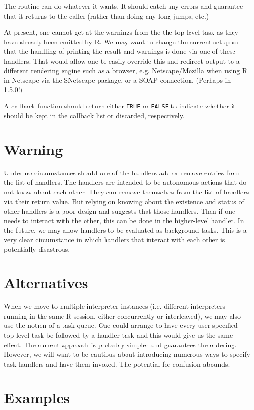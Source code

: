 \documentclass{article}
\begin{document}
The routine can do whatever it wants. It should catch any errors and
guarantee that it returns to the caller (rather than doing any long
jumps, etc.)


At present, one cannot get at the warnings from the the top-level task
as they have already been emitted by R.  We may want to change the
current setup so that the handling of printing the result and warnings
is done via one of these handlers. That would allow one to easily
override this and redirect output to a different rendering engine such
as a browser, e.g.  Netscape/Mozilla when using R in Netscape via the
SNetscape package, or a SOAP connection.  (Perhaps in 1.5.0!)


A callback function should return either \verb+TRUE+ or \verb+FALSE+
to indicate whether it should be kept in the callback list or 
discarded, respectively.

\section{Warning}
Under no circumstances should one of the handlers add or remove
entries from the list of handlers.  The handlers are intended to be
autonomous actions that do not know about each other.  They can remove
themselves from the list of handlers via their return value.  But
relying on knowing about the existence and status of other handlers is
a poor design and suggests that those handlers.  Then if one needs to
interact with the other, this can be done in the higher-level handler.
In the future, we may allow handlers to be evaluated as background
tasks. This is a very clear circumstance in which handlers that
interact with each other is potentially disastrous.


\section{Alternatives}
When we move to multiple interpreter instances (i.e. different
interpreters running in the same R session, either concurrently or
interleaved), we may also use the notion of a task queue.  One could
arrange to have every user-specified top-level task be followed by a
handler task and this would give us the same effect. The current
approach is probably simpler and guarantees the ordering.  However, we
will want to be cautious about introducing numerous ways to specify
task handlers and have them invoked. The potential for confusion
abounds.


\section{Examples}
\end{document}
